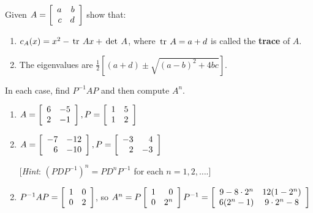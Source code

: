\begin{multicols}{2}
\begin{ex}
Given $A = \left[ \begin{array}{rr}
a & b \\
c & d
\end{array} \right]$
 show that:


\begin{enumerate}[label={\alph*.}]
\item $c_{A}(x) = x^{2} - \thinspace\operatorname{tr \medspace} Ax + \thinspace\operatorname{det \medspace}A$, where $\thinspace\operatorname{tr \medspace} A = a + d$ is called the \textbf{trace} of $A$.

\item The eigenvalues are $\frac{1}{2} \left[ (a+d) \pm \sqrt{(a-b)^2 + 4bc}\right]$.


\end{enumerate}
\end{ex}

\begin{ex}
In each case, find $P^{-1}AP$ and then compute $A^{n}$.


\begin{enumerate}[label={\alph*.}]
\item $ A = \left[ \begin{array}{rr}
6 & -5 \\
2 & -1 
\end{array}\right], P = \left[ \begin{array}{rr}
1 & 5 \\
1 & 2 
\end{array}\right]$


\item $ A = \left[ \begin{array}{rr}
-7 & -12 \\
6 & -10 
\end{array}\right], P = \left[ \begin{array}{rr}
-3 & 4 \\
2 & -3 
\end{array}\right]$

[\textit{Hint}: $(PDP^{-1})^{n} = PD^{n}P^{-1}$ for each $n = 1, 2, \dots$.]

\end{enumerate}
\begin{sol}
\begin{enumerate}[label={\alph*.}]
\setcounter{enumi}{1}
\item  $ P^{-1}AP = \left[ \begin{array}{rr}
1 & 0 \\
0 & 2
\end{array}\right]$, so $A^n  = P \left[ \begin{array}{rr}
1 & 0 \\
0 & 2^n 
\end{array}\right] P^{-1} = \left[ \begin{array}{cc}
9 - 8 \cdot 2^n & 12(1-2^n) \\
6(2^n-1) & 9\cdot 2^n - 8
\end{array}\right]$


\end{enumerate}
\end{sol}
\end{ex}
\end{multicols}
